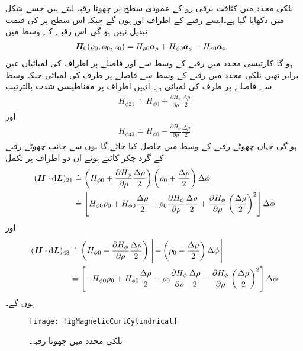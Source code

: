 نلکی محدد میں  کثافت برقی رو کے عمودی سطح پر چھوٹا رقبہ لیتے ہیں جسے شکل  میں دکھایا گیا ہے۔ایسے رقبے کے اطراف  اور  ہوں گے جبکہ اس سطح پر  کی قیمت تبدیل نہیں ہو گی۔اس رقبے کے وسط میں
\begin{align*}
{\ensuremath{{\boldsymbol{H}}}}_0(\rho_0,\phi_0,z_0)&=H_{\rho 0}{\boldsymbol{a}}_{\rho}+H_{\phi 0}{\boldsymbol{a}}_{\phi}+H_{z 0}{\boldsymbol{a}}_{\textup{z}}
\end{align*}
ہو گا۔کارتیسی محدد میں رقبے کے وسط سے  اور  فاصلے پر اطراف کی لمبائیاں عین برابر تھیں۔نلکی محدد میں رقبے کے وسط سے  فاصلے پر طرف کی لمبائی  جبکہ  وسط سے  فاصلے پر طرف کی لمبائی  ہے۔انہیں اطراف پر مقناطیسی شدت  بالترتیب
\begin{align*}
H_{\phi 21}\overset{.}{=}H_{\phi 0}+\frac{\partial H_\phi}{\partial \rho}\frac{\Delta \rho}{2}
\end{align*}
اور
\begin{align*}
H_{\phi 43}\overset{.}{=}H_{\phi 0}-\frac{\partial H_\phi}{\partial \rho}\frac{\Delta \rho}{2}
\end{align*}
ہو گی جہاں  چھوٹے رقبے کے وسط میں حاصل کیا جائے گا۔یوں  سے  جانب چھوٹے رقبے کے گرد چکر کاٹتے ہوئے ان دو اطراف پر تکمل
\begin{align*}
(\kvec{H} \cdot \dif \kvec{L})_{21}&\overset{.}{=}\left(H_{\phi 0}+\frac{\partial H_\phi}{\partial \rho}\frac{\Delta \rho}{2} \right)\left(\rho_0 +\frac{\Delta \rho}{2} \right)\Delta \phi\\
&\overset{.}{=}\left[H_{\phi 0} \rho_0+H_{\phi 0} \frac{\Delta \rho}{2}+\rho_0 \frac{\partial H_\phi}{\partial \rho}\frac{\Delta \rho}{2}+\frac{\partial H_\phi}{\partial \rho} \left(\frac{\Delta \rho}{2} \right)^2\right]\Delta \phi
\end{align*}
اور
\begin{align*}
(\kvec{H} \cdot \dif \kvec{L})_{43}&\overset{.}{=}\left(H_{\phi 0}-\frac{\partial H_\phi}{\partial \rho}\frac{\Delta \rho}{2} \right)\left[-\left(\rho_0 -\frac{\Delta \rho}{2} \right)\Delta \phi\right]\\
&\overset{.}{=}\left[-H_{\phi 0} \rho_0+H_{\phi 0} \frac{\Delta \rho}{2}+\rho_0 \frac{\partial H_\phi}{\partial \rho}\frac{\Delta \rho}{2}-\frac{\partial H_\phi}{\partial \rho} \left(\frac{\Delta \rho}{2} \right)^2\right]\Delta \phi
\end{align*}
ہوں گے۔
\begin{figure}
\centering
\texttt{[image: figMagneticCurlCylindrical]}
\caption{نلکی محدد میں چھوتا رقبہ۔}
\label{شکل_مقناطیسی_نلکی_شدت_رقبہ}
\end{figure}

